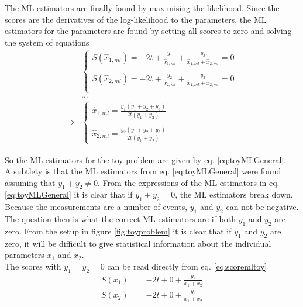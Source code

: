 \documentclass[report,12pt]{report}
\begin{document}
The ML estimators are finally found by maximising the likelihood. Since the scores are the derivatives of the log-likelihood to the parameters, the ML estimators for the parameters are found by setting all scores to zero and solving the system of equations
\begin{align}
	&\left\{\begin{array}{cc} 
	S( \hat x_{1, ml} ) 
	= -2t + \frac{ y_1}{ \hat x_{1, ml}} + 
	\frac{ y_3 }{\hat x_{1, ml} + \hat x_{2, ml}} = 0\\
	\\
	S( \hat x_{2, ml} ) 
	= -2t + \frac{ y_2}{ \hat x_{2, ml}} + 
	\frac{ y_3 }{\hat x_{1, ml} + \hat x_{2, ml}} = 0\\
	\end{array}\right.
	\nonumber\\
	&...
	\nonumber\\
	\Rightarrow
	&\left\{\begin{array}{cc} 
	\hat x_{1, ml} = \frac{y_1(y_1 + y_2 + y_3)}{2t(y_1 + y_2)}\\ 
	\\
	\hat x_{2, ml} = \frac{y_2(y_1 + y_2 + y_3)}{2t(y_1 + y_{2})}   
	\end{array}\right.
	\label{eq:toyMLGeneral}
\end{align}

So the ML estimators for the toy problem are given by eq. \ref{eq:toyMLGeneral}.\\

A subtlety is that the ML estimators from eq. \ref{eq:toyMLGeneral} were found assuming that $y_1 + y_2 \neq 0$. From the expressions of the ML estimators in eq. \ref{eq:toyMLGeneral} it is clear that if $y_1 + y_2 = 0$, the ML estimators break down. Because the measurements are a number of events, $y_1$ and $y_2$ can not be negative. The question then is what the correct ML estimators are if both $y_1$ and $y_2$ are zero. From the setup in figure \ref{fig:toyproblem} it is clear that if $y_1$ and $y_2$ are zero, it will be difficult to give statistical information about the individual parameters $x_1$ and $x_2$.\\

The scores with $y_1 = y_2 = 0$ can be read directly from eq. \ref{eq:scoremltoy}
\begin{align}
	S(x_1) &= -2t + 0 + \frac{y_3}{x_1+x_2}
	\nonumber\\
	S(x_2) &= -2t + 0 + \frac{y_3}{x_1+x_2}
\end{align}
\end{document}
